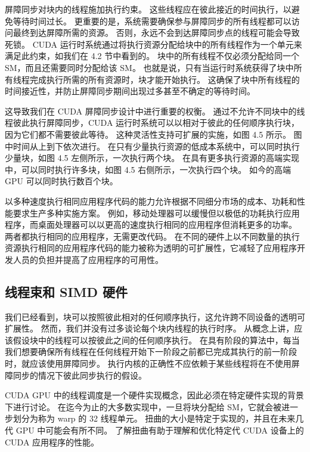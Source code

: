 屏障同步对块内的线程施加执行约束。 这些线程应在彼此接近的时间执行，以避免等待时间过长。 更重要的是，系统需要确保参与屏障同步的所有线程都可以访问最终到达屏障所需的资源。 否则，永远不会到达屏障同步点的线程可能会导致死锁。 CUDA 运行时系统通过将执行资源分配给块中的所有线程作为一个单元来满足此约束，如我们在 4.2 节中看到的。 块中的所有线程不仅必须分配给同一个 SM，而且还需要同时分配给该 SM。 也就是说，只有当运行时系统获得了块中所有线程完成执行所需的所有资源时，块才能开始执行。 这确保了块中所有线程的时间接近性，并防止屏障同步期间出现过多甚至不确定的等待时间。

这导致我们在 CUDA 屏障同步设计中进行重要的权衡。 通过不允许不同块中的线程彼此执行屏障同步，CUDA 运行时系统可以以相对于彼此的任何顺序执行块，因为它们都不需要彼此等待。 这种灵活性支持可扩展的实施，如图 4.5 所示。 图中时间从上到下依次进行。 在只有少量执行资源的低成本系统中，可以同时执行少量块，如图 4.5 左侧所示，一次执行两个块。 在具有更多执行资源的高端实现中，可以同时执行许多块，如图 4.5 右侧所示，一次执行四个块。 如今的高端 GPU 可以同时执行数百个块。

以多种速度执行相同应用程序代码的能力允许根据不同细分市场的成本、功耗和性能要求生产多种实施方案。 例如，移动处理器可以缓慢但以极低的功耗执行应用程序，而桌面处理器可以以更高的速度执行相同的应用程序但消耗更多的功率。 两者都执行相同的应用程序，无需更改代码。 在不同的硬件上以不同数量的执行资源执行相同的应用程序代码的能力被称为透明的可扩展性，它减轻了应用程序开发人员的负担并提高了应用程序的可用性。

\subsection{线程束和 SIMD 硬件}
我们已经看到，块可以按照彼此相对的任何顺序执行，这允许跨不同设备的透明可扩展性。 然而，我们并没有过多谈论每个块内线程的执行时序。 从概念上讲，应该假设块中的线程可以按彼此之间的任何顺序执行。 在具有阶段的算法中，每当我们想要确保所有线程在任何线程开始下一阶段之前都已完成其执行的前一阶段时，就应该使用屏障同步。 执行内核的正确性不应依赖于某些线程将在不使用屏障同步的情况下彼此同步执行的假设。

CUDA GPU 中的线程调度是一个硬件实现概念，因此必须在特定硬件实现的背景下进行讨论。 在迄今为止的大多数实现中，一旦将块分配给 SM，它就会被进一步划分为称为 warp 的 32 线程单元。 扭曲的大小是特定于实现的，并且在未来几代 GPU 中可能会有所不同。 了解扭曲有助于理解和优化特定代 CUDA 设备上的 CUDA 应用程序的性能。


